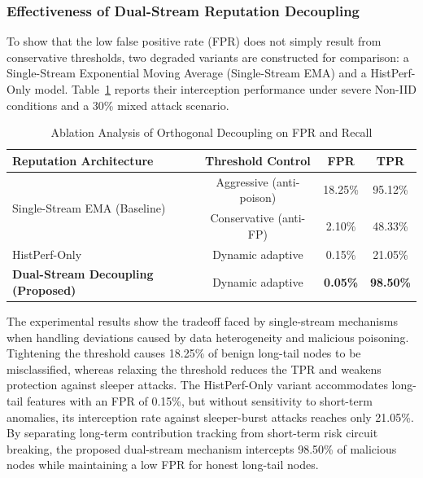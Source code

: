 \documentclass[runningheads,orivec]{llncs}
\begin{document}
\subsubsection{Effectiveness of Dual-Stream Reputation Decoupling}
To show that the low false positive rate (FPR) does not simply result from conservative thresholds, two degraded variants are constructed for comparison: a Single-Stream Exponential Moving Average (Single-Stream EMA) and a HistPerf-Only model. Table~\ref{tab:ablation_stream} reports their interception performance under severe Non-IID conditions and a 30\% mixed attack scenario.

\begin{table}[htbp]
    \centering
    \caption{Ablation Analysis of Orthogonal Decoupling on FPR and Recall}
    \label{tab:ablation_stream}
    \begin{tabular}{l c c c}
        \toprule
        \textbf{Reputation Architecture}              & \textbf{Threshold Control} & \textbf{FPR}    & \textbf{TPR}     \\
        \midrule
        \multirow{2}{*}{Single-Stream EMA (Baseline)} & Aggressive (anti-poison)   & 18.25\%         & 95.12\%          \\
                                                      & Conservative (anti-FP)     & 2.10\%          & 48.33\%          \\
        \midrule
        HistPerf-Only                                 & Dynamic adaptive           & 0.15\%          & 21.05\%          \\
        \textbf{Dual-Stream Decoupling (Proposed)}    & Dynamic adaptive           & \textbf{0.05\%} & \textbf{98.50\%} \\
        \bottomrule
    \end{tabular}
\end{table}

The experimental results show the tradeoff faced by single-stream mechanisms when handling deviations caused by data heterogeneity and malicious poisoning. Tightening the threshold causes 18.25\% of benign long-tail nodes to be misclassified, whereas relaxing the threshold reduces the TPR and weakens protection against sleeper attacks. The HistPerf-Only variant accommodates long-tail features with an FPR of 0.15\%, but without sensitivity to short-term anomalies, its interception rate against sleeper-burst attacks reaches only 21.05\%. By separating long-term contribution tracking from short-term risk circuit breaking, the proposed dual-stream mechanism intercepts 98.50\% of malicious nodes while maintaining a low FPR for honest long-tail nodes.
\end{document}
